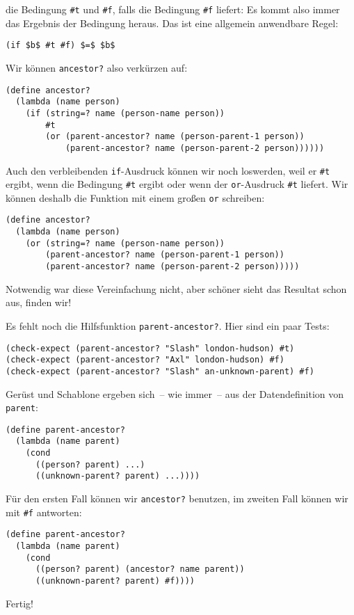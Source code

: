 die Bedingung \lstinline{#t} und \lstinline{#f}, falls die Bedingung
\lstinline{#f} liefert: Es kommt also immer das Ergebnis der Bedingung
heraus.  Das ist eine allgemein anwendbare Regel:
%
\begin{lstlisting}
(if $b$ #t #f) $=$ $b$
\end{lstlisting}
%
Wir können \lstinline{ancestor?} also verkürzen auf:
%
\begin{lstlisting}
(define ancestor?
  (lambda (name person)
    (if (string=? name (person-name person))
        #t
        (or (parent-ancestor? name (person-parent-1 person))
            (parent-ancestor? name (person-parent-2 person))))))
\end{lstlisting}
%
Auch den verbleibenden \lstinline{if}-Ausdruck können wir noch
loswerden, weil er \lstinline{#t} ergibt, wenn die Bedingung
\lstinline{#t} ergibt oder wenn der \lstinline{or}-Ausdruck
\lstinline{#t} liefert.  Wir können deshalb die Funktion mit einem
großen \lstinline{or} schreiben:
%
\begin{lstlisting}
(define ancestor?
  (lambda (name person)
    (or (string=? name (person-name person))
        (parent-ancestor? name (person-parent-1 person))
        (parent-ancestor? name (person-parent-2 person)))))
\end{lstlisting}
%
Notwendig war diese Vereinfachung nicht, aber schöner sieht das
Resultat schon aus, finden wir!

Es fehlt noch die Hilfsfunktion \lstinline{parent-ancestor?}.  Hier
sind ein paar Tests:
%
\begin{lstlisting}
(check-expect (parent-ancestor? "Slash" london-hudson) #t)
(check-expect (parent-ancestor? "Axl" london-hudson) #f)
(check-expect (parent-ancestor? "Slash" an-unknown-parent) #f)
\end{lstlisting}
%
Gerüst und Schablone ergeben sich~-- wie immer~-- aus der
Datendefinition von \lstinline{parent}:
%
\begin{lstlisting}
(define parent-ancestor?
  (lambda (name parent)
    (cond
      ((person? parent) ...)
      ((unknown-parent? parent) ...))))
\end{lstlisting}
%
Für den ersten Fall können wir \lstinline{ancestor?} benutzen, im
zweiten Fall können wir mit \lstinline{#f} antworten:
%
\begin{lstlisting}
(define parent-ancestor?
  (lambda (name parent)
    (cond
      ((person? parent) (ancestor? name parent))
      ((unknown-parent? parent) #f))))
\end{lstlisting}
%
Fertig!

